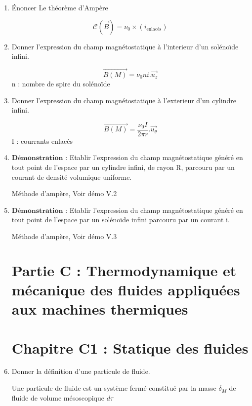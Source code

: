 \documentclass{article}
\begin{document}
\begin{enumerate}[label=\arabic{enumi} - , left=0pt, itemsep=1em]
    \item Énoncer Le théorème d'Ampère \par
    \begin{solution}
         \[ \mathscr{C}(\vec{B}) = \nu_0 \times (i_{\text{enlacés}})\]
    \end{solution}
    
    \item Donner l'expression du champ magnétostatique à l'interieur d'un solénoïde infini.\par
    \begin{solution}
         \[ \vec{B(M)} = \nu_0 n i . \vec{u_z}\] n : nombre de spire du solénoïde
    \end{solution}

    \item Donner l'expression du champ magnétostatique à l'exterieur d'un cylindre infini.\par
    \begin{solution}
         \[ \vec{B(M)} = \frac{\nu_0 I}{2 \pi r} . \vec{u_{\theta}}\] I : courrants enlacés
    \end{solution}

    \item  $\textbf{Démonstration :}$ Etablir l’expression du champ magnétostatique généré en tout point de l’espace par un
    cylindre infini, de rayon R, parcouru par un courant de densité volumique uniforme.\par
    \begin{solution}
         Méthode d'ampère, Voir démo V.2

    \end{solution}


    \item $\textbf{Démonstration :}$ Etablir l’expression du champ magnétostatique généré en tout point de l’espace par un
    solénoïde infini parcouru par un courant i.\par
    \begin{solution}
         Méthode d'ampère, Voir démo V.3

    \end{solution}

\section*{\centering\huge Partie C : Thermodynamique et mécanique des fluides appliquées aux machines thermiques}

\section*{\centering Chapitre C1 : Statique des fluides}
    \item Donner la définition d'une particule de fluide. \par
    \begin{solution}
     Une particule de fluide est un système fermé constitué par la masse $\delta_M$ de fluide de volume mésoscopique $d\tau$
    \end{solution}


\end{enumerate}
\end{document}

